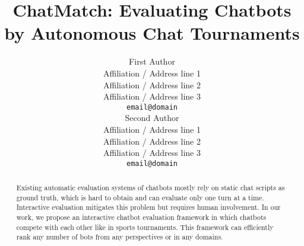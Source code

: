 \documentclass[11pt]{article}
\title{ChatMatch: Evaluating Chatbots by Autonomous Chat Tournaments}
\author{First Author \\
  Affiliation / Address line 1 \\
  Affiliation / Address line 2 \\
  Affiliation / Address line 3 \\
  \texttt{email@domain} \\\And
  Second Author \\
  Affiliation / Address line 1 \\
  Affiliation / Address line 2 \\
  Affiliation / Address line 3 \\
  \texttt{email@domain} \\}
\begin{document}
\maketitle
\begin{abstract}
Existing automatic evaluation systems of chatbots mostly rely on static chat 
scripts as ground truth, which is hard to obtain and can evaluate only one turn
at a time. Interactive evaluation mitigates this problem but requires human
involvement. In our work, we propose an interactive chatbot evaluation framework 
in which chatbots compete with each other like in sports tournaments. This framework
can efficiently rank any number of bots from any perspectives or in any domains. 
\end{abstract}












\end{document}
